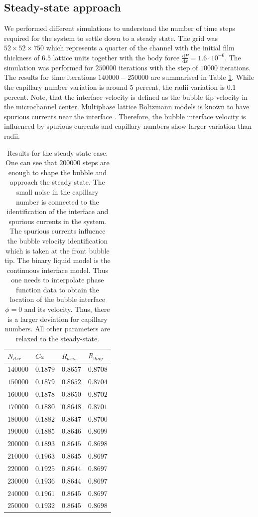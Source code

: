 \documentclass[preprint,12pt]{elsarticle}
\begin{document}
\subsection{Steady-state approach}
\label{sec:steady:state}
We performed different simulations to understand the number of time steps required for the
system to
settle down to a steady state. The grid  was $52 \times 52 \times 750$ which represents
a quarter of the channel with the initial film thickness of $6.5$ lattice units together
with the body force $\frac{\mathrm{d}P}{\mathrm{d}x}=1.6
\cdot 10^{-6}$. The simulation was performed for $250000$ iterations with the step of
$10000$ iterations. The results for time iterations $140000-250000$ are summarised in Table
\ref{table:steady:state}. While the
capillary number variation is around $5$ percent, the radii variation is $0.1$ percent. Note, that
the interface velocity is defined as the bubble tip velocity in the microchannel center. Multiphase
lattice Boltzmann models is known to have spurious currents near the interface
\cite{pooley-spurious,shan-spurious}. Therefore, the bubble interface velocity is influenced by
spurious currents and capillary numbers show larger variation than radii. 
\begin{table}
\begin{tabularx}{\textwidth}{|X|X|X|X|}
\hline
$N_{iter}$&$Ca$&$R_{axis}$&$R_{diag}$\\
\hline
$140000$&$0.1879$&$0.8657$&$0.8708$\\
$150000$&$0.1879$&$0.8652$&$0.8704$\\
$160000$&$0.1878$&$0.8650$&$0.8702$\\
$170000$&$0.1880$&$0.8648$&$0.8701$\\
$180000$&$0.1882$&$0.8647$&$0.8700$\\
$190000$&$0.1885$&$0.8646$&$0.8699$\\
$200000$&$0.1893$&$0.8645$&$0.8698$\\
$210000$&$0.1963$&$0.8645$&$0.8697$\\
$220000$&$0.1925$&$0.8644$&$0.8697$\\
$230000$&$0.1936$&$0.8644$&$0.8697$\\
$240000$&$0.1961$&$0.8645$&$0.8697$\\
$250000$&$0.1932$&$0.8645$&$0.8698$\\
\hline
\end{tabularx}
\caption{Results for the steady-state case. One
can see that $200000$ steps are enough to shape
the bubble and approach the steady state. The small noise in the capillary number is connected to
the identification of the interface and spurious currents in the system. The spurious currents
influence the bubble velocity identification which is taken at the front bubble tip. The binary
liquid model is the continuous interface model. Thus one needs to interpolate phase function data to
obtain the location of the bubble interface $\phi=0$ and its velocity. Thus, there is a larger
deviation for capillary numbers. All other parameters are relaxed to the
steady-state.\label{table:steady:state}}
\end{table}
\end{document}
